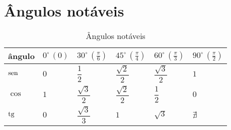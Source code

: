 \section{Ângulos notáveis}
	\begin{table}[H]
		\caption{Ângulos notáveis}
		\label{angulos_notaveis}
		\centering
		\begin{tabular}{|l|l|l|l|l|l|}
			\hline
			ângulo & $0^\circ\, (0)$ & $30^\circ\, \left(\frac{\pi}{6}\right)$ & $45^\circ\, \left(\frac{\pi}{4}\right)$ & $60^\circ\, \left(\frac{\pi}{3}\right)$ & $90^\circ\, \left(\frac{\pi}{2}\right)$ \\ \hline
			$\operatorname{sen}$ & $0$             & $\dfrac{1}{2}$                          & $\dfrac{\sqrt{2}}{2}$                   & $\dfrac{\sqrt{3}}{2}$                   & $1$                                     \\ \hline
			$\cos$ & $1$             & $\dfrac{\sqrt{3}}{2}$                   & $\dfrac{\sqrt{2}}{2}$                   & $\dfrac{1}{2}$                          & $0$                                     \\ \hline
			$\operatorname{tg}$  & $0$             & $\dfrac{\sqrt{3}}{3}$                   & $1$                                     & $\sqrt{3}$                              & $\nexists$                                \\ \hline
		\end{tabular}		
	\end{table}